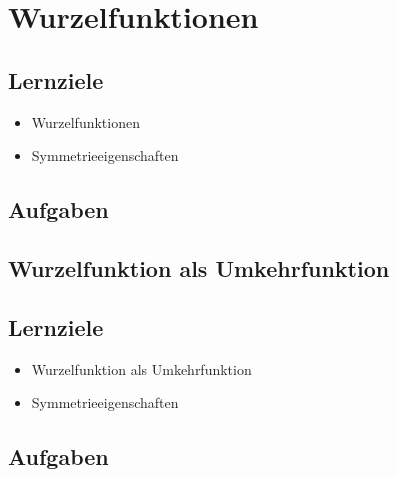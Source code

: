 \section{Wurzelfunktionen}

\subsection*{Lernziele}

\begin{itemize}
\item Wurzelfunktionen
\item Symmetrieeigenschaften
\end{itemize}

\subsection*{Aufgaben}




\newpage

\subsection{Wurzelfunktion als Umkehrfunktion}

\subsection*{Lernziele}

\begin{itemize}
\item Wurzelfunktion als Umkehrfunktion
\item Symmetrieeigenschaften
\end{itemize}

\subsection*{Aufgaben}


\newpage
